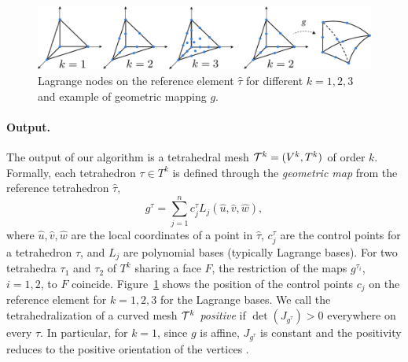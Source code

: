 \begin{figure}
    \centering
    \includegraphics[width=\linewidth]{curve_meshing_in_shell_tex/figs/illustrations/high-order.pdf}
    \caption{Lagrange nodes on the reference element $\hat \tau$ for different $k=1,2,3$ and example of geometric mapping $g$.}
    \label{bichon:fig:high-order}
\end{figure}

\paragraph{Output.}
The output of our algorithm is a tetrahedral mesh $\mathcal{T}^k = (V^k,T^k)$ of order $k$. 
Formally, each tetrahedron $\tau\in T^k$ is defined through the \emph{geometric map} from the reference tetrahedron $\hat \tau$,
\begin{equation}\label{eq:gmap}
g^\tau = \sum_{j=1}^n c_j^\tau L_j(\hat u,\hat v,\hat w),
\end{equation}
where $\hat u,\hat v,\hat w$ are the local coordinates of a point in $\hat \tau$, $c_j^\tau$ are the control points for a tetrahedron $\tau$, and $L_j$ are polynomial bases (typically Lagrange bases).
For two tetrahedra $\tau_1$ and $\tau_2$ 
of $T^k$ sharing a face $F$, the restriction of the maps $g^{\tau_i}$, $i=1,2$, to $F$ coincide.
Figure~\ref{bichon:fig:high-order} shows the position of the control points $c_j$ on the reference element for $k=1,2,3$ for the Lagrange bases. We call the tetrahedralization of a curved mesh $\mathcal{T}^k$ \emph{positive} if $\det(J_{g^\tau}) > 0$ everywhere on every $\tau$. 
In particular, for $k=1$, since $g$ is affine, $J_{g^\tau}$ is constant and the positivity reduces to the positive orientation of the vertices \cite{shewchuk1997adaptive}.

